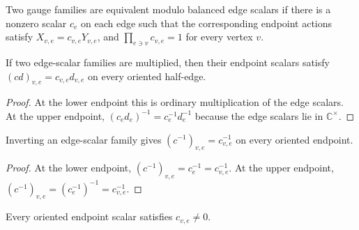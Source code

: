 \begin{definition}%
    \label{def:GaugeEquivModEdgeScalars}
    \leanok
    Two gauge families are equivalent modulo balanced edge scalars if there is
    a nonzero scalar $c_e$ on each edge such that the corresponding endpoint
    actions satisfy $X_{v,e}=c_{v,e}Y_{v,e}$, and
    $\prod_{e\ni v}c_{v,e}=1$ for every vertex $v$.
\end{definition}

\begin{theorem}%
    \label{thm:edgeScalarAt_mul}
    \leanok
    If two edge-scalar families are multiplied, then their endpoint scalars
    satisfy $(cd)_{v,e}=c_{v,e}d_{v,e}$ on every oriented half-edge.
    \begin{center}
        \TNPEPSEdgeGaugeOrientation
    \end{center}
\end{theorem}

\begin{proof}\leanok
    At the lower endpoint this is ordinary multiplication of the edge scalars.
    At the upper endpoint, $(c_ed_e)^{-1}=c_e^{-1}d_e^{-1}$ because the
    edge scalars lie in $\mathbb C^\times$.
\end{proof}

\begin{theorem}%
    \label{thm:edgeScalarAt_inv}
    \leanok
    Inverting an edge-scalar family gives
    $(c^{-1})_{v,e}=c_{v,e}^{-1}$ on every oriented endpoint.
\end{theorem}

\begin{proof}\leanok
    At the lower endpoint, $(c^{-1})_{v,e}=c_e^{-1}=c_{v,e}^{-1}$.
    At the upper endpoint,
    $(c^{-1})_{v,e}=(c_e^{-1})^{-1}=c_{v,e}^{-1}$.
\end{proof}

\begin{theorem}%
    \label{thm:edgeScalarAt_ne_zero}
    \leanok
    Every oriented endpoint scalar satisfies $c_{v,e}\ne 0$.
\end{theorem}

